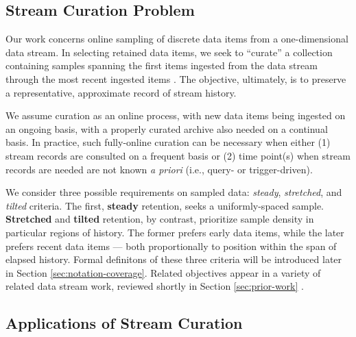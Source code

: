 \subsection{Stream Curation Problem}

Our work concerns online sampling of discrete data items from a one-dimensional data stream.
In selecting retained data items, we seek to ``curate'' a collection containing samples spanning the first items ingested from the data stream through the most recent ingested items \citep{moreno2024algorithms}.
The objective, ultimately, is to preserve a representative, approximate record of stream history.

We assume curation as an online process, with new data items being ingested on an ongoing basis, with a properly curated archive also needed on a continual basis.
In practice, such fully-online curation can be necessary when either (1) stream records are consulted on a frequent basis or (2) time point(s) when stream records are needed are not known \textit{a priori} (i.e., query- or trigger-driven).

We consider three possible requirements on sampled data: \textit{steady}, \textit{stretched}, and \textit{tilted} criteria.
The first, \textbf{steady} retention, seeks a uniformly-spaced sample.
\textbf{Stretched} and \textbf{tilted} retention, by contrast, prioritize sample density in particular regions of history.
The former prefers early data items, while the later prefers recent data items --- both proportionally to position within the span of elapsed history.
Formal definitons of these three criteria will be introduced later in Section \ref{sec:notation-coverage}.
Related objectives appear in a variety of related data stream work, reviewed shortly in Section \ref{sec:prior-work} \citep{aggarwal2003framework,han2005stream}.


\subsection{Applications of Stream Curation}

